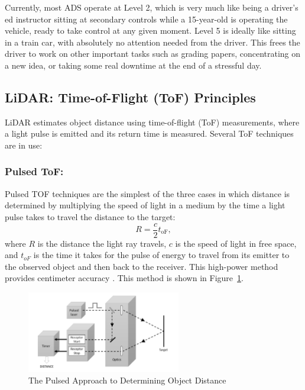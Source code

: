 \documentclass[12pt]{article}
\begin{document}
Currently, most ADS operate at Level 2, which is very much like being a
driver's ed instructor sitting at secondary controls while a 15-year-old is
operating the vehicle, ready to take control at any given moment. Level 5 is
ideally like sitting in a train car, with
absolutely no attention needed from the driver. This frees the driver to work on
other important tasks such as grading papers, concentrating on a new idea, or
taking some real downtime at the end of a stressful day.

\subsection{LiDAR: Time-of-Flight (ToF) Principles}

LiDAR estimates object distance using time-of-flight (ToF) measurements, where a light pulse is emitted and its return time is measured. Several ToF techniques are in use:

\subsubsection{Pulsed ToF:}
Pulsed TOF techniques are the simplest of the three cases in which distance is
determined by multiplying the speed of light in a medium by the time a light
pulse takes to travel the distance to the target:
\begin{equation}
R = \frac{c}{2} t_{\text{oF}},
\label{eq:tof_pulse}
\end{equation}
where $R$ is the distance the light ray travels, $c$ is the speed of
light in free space, and $t_{oF}$ is the time it takes for the pulse of energy
to travel from its emitter to the observed object and then back to the receiver.
This high-power method provides centimeter accuracy \cite{2019Royo}. This method is shown in
Figure~\ref{fig:pulse}.
\begin{figure}[H]
	\centering
	\includegraphics[width=0.6\textwidth]{lidar.png}
	\caption{The Pulsed Approach to Determining Object Distance \cite{2019Royo}}
	\label{fig:pulse}
\end{figure}
\end{document}
